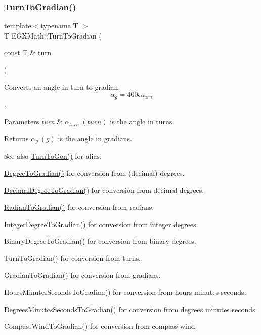 \subsubsection{\texorpdfstring{Turn\+To\+Gradian()}{TurnToGradian()}}
{\footnotesize\ttfamily template$<$typename T $>$ \\
T E\+G\+X\+Math\+::\+Turn\+To\+Gradian (\begin{DoxyParamCaption}\item[{const T \&}]{turn }\end{DoxyParamCaption})}



Converts an angle in turn to gradian. \[\alpha_{g}=400\alpha_{turn}\]. 


\begin{DoxyParams}{Parameters}
{\em turn} & $\alpha_{turn}\ (turn)$ is the angle in turns. \\
\hline
\end{DoxyParams}
\begin{DoxyReturn}{Returns}
$\alpha_{g}\ (g)$ is the angle in gradians. 
\end{DoxyReturn}
\begin{DoxySeeAlso}{See also}
\mbox{\hyperlink{group___e_g_x_math-_angle_conversions-_turn_gad81dd0bb1660ef24e28fa15b2403dec7}{Turn\+To\+Gon()}} for alias. 

\mbox{\hyperlink{group___e_g_x_math-_angle_conversions-_degree_ga25bb5506b3f66fff7a1b85bf7bd795b3}{Degree\+To\+Gradian()}} for conversion from (decimal) degrees. 

\mbox{\hyperlink{group___e_g_x_math-_angle_conversions-_decimal_degree_ga3ac6f1ceb36a4938cdf3b55554734c99}{Decimal\+Degree\+To\+Gradian()}} for conversion from decimal degrees. 

\mbox{\hyperlink{group___e_g_x_math-_angle_conversions-_radian_ga3c1607eae50cbf0186c42485bb3878d5}{Radian\+To\+Gradian()}} for conversion from radians. 

\mbox{\hyperlink{group___e_g_x_math-_angle_conversions-_integer_degree_ga47127467ff7a8ef57f6be9ce496a97df}{Integer\+Degree\+To\+Gradian()}} for conversion from integer degrees. 

Binary\+Degree\+To\+Gradian() for conversion from binary degrees. 

\mbox{\hyperlink{group___e_g_x_math-_angle_conversions-_turn_gad6aa9bdde2cde17cec136b24ee017bba}{Turn\+To\+Gradian()}} for conversion from turns. 

Gradian\+To\+Gradian() for conversion from gradians. 

Hours\+Minutes\+Seconds\+To\+Gradian() for conversion from hours minutes seconds. 

Degrees\+Minutes\+Seconds\+To\+Gradian() for conversion from degrees minutes seconds. 

Compass\+Wind\+To\+Gradian() for conversion from compass wind. 
\end{DoxySeeAlso}
\mbox{\label{group___e_g_x_math-_angle_conversions-_turn_ga74efaece2f95aa6671f18382e5f3925f}} 
